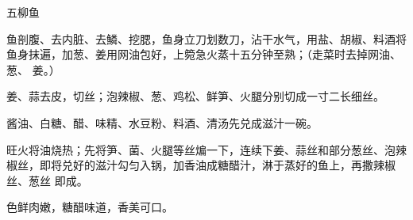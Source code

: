 \begin{recipe}{五柳鱼}

\ingredients


\preparation

\step 鱼剖腹、去内脏、去鱗、挖腮，鱼身立刀划数刀，沾干水气，用盐、胡椒、料酒将
鱼身抹遍，加葱、姜用网油包好，上箢急火蒸十五分钟至熟；（走菜时去掉网油、葱、
姜。）

\step 姜、蒜去皮，切丝；泡辣椒、葱、鸡松、鲜笋、火腿分别切成一寸二长细丝。

\step 酱油、白糖、醋、味精、水豆粉、料酒、清汤先兑成滋汁一碗。

\step 旺火将油烧热；先将笋、菌、火腿等丝煸一下，连续下姜、蒜丝和部分葱丝、泡辣
椒丝，即将兑好的滋汁勾匀入锅，加香油成糖醋汁，淋于蒸好的鱼上，再撒辣椒丝、葱丝
即成。

\features

色鲜肉嫩，糖醋味道，香美可口。

\end{recipe}

